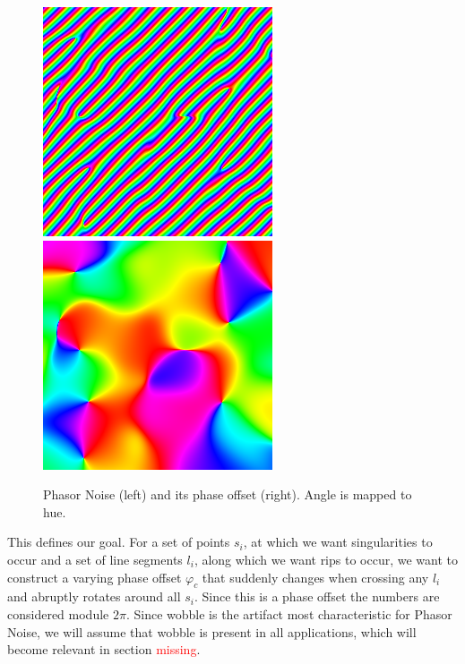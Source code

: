 \documentclass{utue} %
\begin{document}
\begin{figure}[h]
  \centering
  \includegraphics[width=0.45\linewidth]{images/phasorNoise}
  \includegraphics[width=0.45\linewidth]{images/phasorPhase}
  \caption{Phasor Noise (left) and its phase offset (right). Angle is mapped to hue.}\label{fig:phasorNoisePhase}
\end{figure}

This defines our goal. For a set of points $s_i$, at which we want singularities to occur and a set of line segments $l_i$, along which we want rips to occur, we want to construct a varying phase offset $\varphi_c$ that suddenly changes when crossing any $l_i$ and abruptly rotates around all $s_i$. Since this is a phase offset the numbers are considered module $2\pi$. Since wobble is the artifact most characteristic for Phasor Noise, we will assume that wobble is present in all applications, which will become relevant in section \textcolor{red}{missing}.
\end{document}
